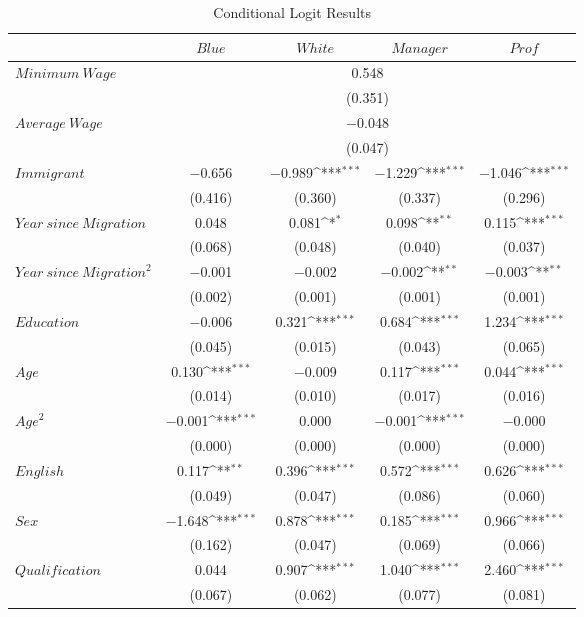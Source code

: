 {\scriptsize
\def\sym#1{\ifmmode^{#1}\else\(^{#1}\)\fi}
\begin{longtable}{l*{4}{c}}
  \caption{Conditional Logit Results \label{tab:clogit}} \\
  \toprule
  & $\mathit{Blue}$ & $\mathit{White}$
  & $\mathit{Manager}$ & $\mathit{Prof}$ \\
  \midrule
  $\mathit{Minimum\ Wage}$& \multicolumn{4}{c}{0.548} \\
  & \multicolumn{4}{c}{(0.351)} \\
  $\mathit{Average\ Wage}$& \multicolumn{4}{c}{$-$0.048} \\
  & \multicolumn{4}{c}{(0.047)} \\
  $\mathit{Immigrant}$& $-$0.656 & $-$0.989\sym{***}& $-$1.229\sym{***}& $-$1.046\sym{***}\\
  & (0.416) & (0.360) & (0.337) & (0.296) \\
  $\mathit{Year\ since\ Migration}$& 0.048 & 0.081\sym{*}  & 0.098\sym{**} & 0.115\sym{***}\\
  & (0.068) & (0.048) & (0.040) & (0.037) \\
  $\mathit{Year\ since\ Migration}^2$& $-$0.001 & $-$0.002 & $-$0.002\sym{**} & $-$0.003\sym{**} \\
  & (0.002) & (0.001) & (0.001) & (0.001) \\
  $\mathit{Education}$& $-$0.006 & 0.321\sym{***}& 0.684\sym{***}& 1.234\sym{***}\\
  & (0.045) & (0.015) & (0.043) & (0.065) \\
  $\mathit{Age}$& 0.130\sym{***}& $-$0.009 & 0.117\sym{***}& 0.044\sym{***}\\
  & (0.014) & (0.010) & (0.017) & (0.016) \\
  $\mathit{Age}^2$& $-$0.001\sym{***}& 0.000 & $-$0.001\sym{***}& $-$0.000 \\
  & (0.000) & (0.000) & (0.000) & (0.000) \\
  $\mathit{English}$& 0.117\sym{**} & 0.396\sym{***}& 0.572\sym{***}& 0.626\sym{***}\\
  & (0.049) & (0.047) & (0.086) & (0.060) \\
  $\mathit{Sex}$& $-$1.648\sym{***}& 0.878\sym{***}& 0.185\sym{***}& 0.966\sym{***}\\
  & (0.162) & (0.047) & (0.069) & (0.066) \\
  $\mathit{Qualification}$& 0.044 & 0.907\sym{***}& 1.040\sym{***}& 2.460\sym{***}\\
  & (0.067) & (0.062) & (0.077) & (0.081) \\

\end{longtable}}
